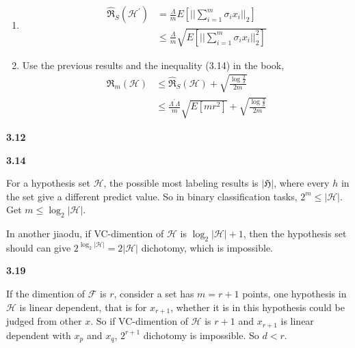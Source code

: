 \documentclass[12pt]{article}
\begin{document}
\begin{enumerate}[label=(\alph*), left=0pt]
    \item
    \begin{align*}
        \hat{\mathfrak{R}}_{S}(\mathcal{H^{'}}) &= \frac{\Lambda}{m} E[||\sum \limits_{i=1}^{m} \sigma_{i}x_{i}||_{2}] \\
        &\le \frac{\Lambda}{m} \sqrt{E[||\sum \limits_{i=1}^{m} \sigma_{i}x_{i}||_{2}^{2}]}
    \end{align*}

    \item
    Use the previous results and the inequality (3.14) in the book,
    \begin{align*}
        \mathfrak{R}_{m}(\mathcal{H}) &\le \hat{\mathfrak{R}}_{S}(\mathcal{H}) + \sqrt{\frac{\log \frac{2}{\delta}}{2m}} \\
        &\le \frac{\Lambda^{'} \Lambda}{m} \sqrt{E[m r^{2}]} + \sqrt{\frac{\log \frac{2}{\delta}}{2m}}
    \end{align*}
\end{enumerate}

\vspace{1em}  %

\noindent \textbf{3.12}

\vspace{1em}  %

\noindent \textbf{3.14}

For a hypothesis set $\mathcal{H}$, the possible most labeling results is $|\mathfrak{H}|$, 
where every $h$ in the set give a different predict value. So in binary classification tasks,
$2^{m} \le |\mathcal{H}|$. Get $m \le \log_{2} |\mathcal{H}|$.

In another jiaodu, if VC-dimention of $\mathcal{H}$ is $\log_{2} |\mathcal{H}| + 1$, then the 
hypothesis set should can give $2^{\log_{2} |\mathcal{H}|} = 2|\mathcal{H}|$ dichotomy, which 
is impossible.

\vspace{1em}  %

\noindent \textbf{3.19}

If the dimention of $\mathcal{F}$ is $r$, consider a set has $m = r+1$ points, one hypothesis
in $\mathcal{H}$ is linear dependent, that is for $x_{r+1}$, whether it is in this hypothesis
could be judged from other $x$. So if VC-dimention of $\mathcal{H}$ is $r+1$ and $x_{r+1}$ is
linear dependent with $x_{p}$ and $x_{q}$, $2^{r+1}$ dichotomy is impossible. So $d < r$.

\vspace{1em}  %
\end{document}
